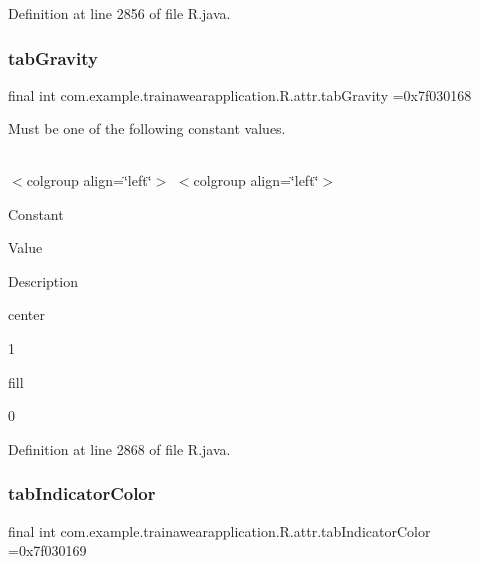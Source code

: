 Definition at line 2856 of file R.\+java.

\mbox{\label{classcom_1_1example_1_1trainawearapplication_1_1_r_1_1attr_ad1e0d1b9905a0b0c8fc53428f7de9e4d}} 
\subsubsection{\texorpdfstring{tabGravity}{tabGravity}}
{\footnotesize\ttfamily final int com.\+example.\+trainawearapplication.\+R.\+attr.\+tab\+Gravity =0x7f030168\hspace{0.3cm}{\ttfamily [static]}}

Must be one of the following constant values.

\tabulinesep=1mm
\begin{longtabu}spread 0pt [c]{*{0}{|X[-1]}|}
\hline
\end{longtabu}
$<$colgroup align=\char`\"{}left\char`\"{}$>$ $<$colgroup align=\char`\"{}left\char`\"{}$>$ 

Constant

Value

Description 

center

1

fill

0

Definition at line 2868 of file R.\+java.

\mbox{\label{classcom_1_1example_1_1trainawearapplication_1_1_r_1_1attr_ad2b3d72bf91d922bd86b1bf13cd8bcc3}} 
\subsubsection{\texorpdfstring{tabIndicatorColor}{tabIndicatorColor}}
{\footnotesize\ttfamily final int com.\+example.\+trainawearapplication.\+R.\+attr.\+tab\+Indicator\+Color =0x7f030169\hspace{0.3cm}{\ttfamily [static]}}

